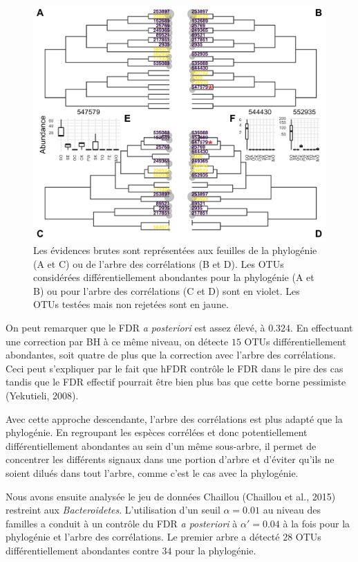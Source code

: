 \documentclass[12pt,a4paper]{reedthesis}
\theoremstyle{definition}
\theoremstyle{definition}
\theoremstyle{definition}
\theoremstyle{remark}
\begin{document}
\begin{figure}[!t]

{\centering \includegraphics[width=0.9\linewidth]{img/chlamydiae} 

}

\caption{Les évidences brutes sont représentées aux feuilles de la phylogénie (A et C) ou de l'arbre des corrélations (B et D). Les OTUs considérées différentiellement abondantes pour la phylogénie (A et B) ou pour l'arbre des corrélations (C et D) sont en violet. Les OTUs testées mais non rejetées sont en jaune.}\label{fig:chlamydiae}
\end{figure}
On peut remarquer que le FDR \emph{a posteriori} est assez élevé, à \(0.324\). En effectuant une correction par BH à ce même niveau, on détecte \(15\) OTUs différentiellement abondantes, soit quatre de plus que la correction avec l'arbre des corrélations. Ceci peut s'expliquer par le fait que hFDR contrôle le FDR dans le pire des cas tandis que le FDR effectif pourrait être bien plus bas que cette borne pessimiste (Yekutieli, 2008).

Avec cette approche descendante, l'arbre des corrélations est plus adapté que la phylogénie. En regroupant les espèces corrélées et donc potentiellement différentiellement abondantes au sein d'un même sous-arbre, il permet de concentrer les différents signaux dans une portion d'arbre et d'éviter qu'ils ne soient dilués dans tout l'arbre, comme c'est le cas avec la phylogénie.

Nous avons ensuite analysée le jeu de données Chaillou (Chaillou et al., 2015) restreint aux \emph{Bacteroidetes}. L'utilisation d'un seuil \(\alpha=0.01\) au niveau des familles a conduit à un contrôle du FDR \emph{a posteriori} à \(\alpha'=0.04\) à la fois pour la phylogénie et l'arbre des corrélations. Le premier arbre a détecté \(28\) OTUs différentiellement abondantes contre \(34\) pour la phylogénie.
\end{document}
